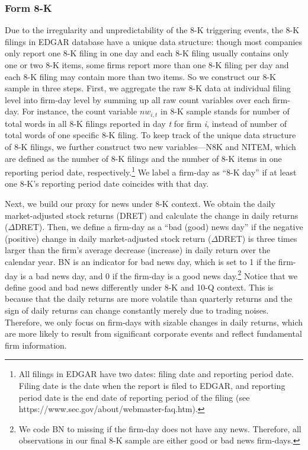 \documentclass[letterpaper,11pt]{article}
\begin{document}
\begin{spacing}{1.5}
\subsubsection{Form 8-K}
Due to the irregularity and unpredictability of the 8-K triggering events, the 8-K filings in EDGAR database have a unique data structure: though most companies only report one 8-K filing in one day and each 8-K filing usually contains only one or two 8-K items, some firms report more than one 8-K filing per day and each 8-K filing may contain more than two items. So we construct our 8-K sample in three steps. First, we aggregate the raw 8-K data at individual filing level into firm-day level by summing up all raw count variables over each firm-day. For instance, the count variable $nw_{i,t}$ in 8-K sample stands for number of total words in all 8-K filings reported in day \textit{t} for firm \textit{i}, instead of number of total words of one specific 8-K filing. To keep track of the unique data structure of 8-K filings, we further construct two new variables---N8K and NITEM, which are defined as the number of 8-K filings and the number of 8-K items in one reporting period date, respectively.\footnote{All filings in EDGAR have two dates: filing date and reporting period date. Filing date is the date when the report is filed to EDGAR, and reporting period date is the end date of reporting period of the filing (see https://www.sec.gov/about/webmaster-faq.htm).} We label a firm-day as ``8-K day” if at least one 8-K's reporting period date coincides with that day.

Next, we build our proxy for news under 8-K context. We obtain the daily market-adjusted stock returns (DRET) and calculate the change in daily returns ($\Delta$DRET). Then, we define a firm-day as a ``bad (good) news day” if the negative (positive) change in daily market-adjusted stock return ($\Delta$DRET) is three times larger than the firm's average decrease (increase) in daily return over the calendar year. BN is an indicator for bad news day, which is set to 1 if the firm-day is a bad news day, and 0 if the firm-day is a good news day.\footnote{We code BN to missing if the firm-day does not have any news. Therefore, all observations in our final 8-K sample are either good or bad news firm-days.} Notice that we define good and bad news differently under 8-K and 10-Q context. This is because that the daily returns are more volatile than quarterly returns and the sign of daily returns can change constantly merely due to trading noises. Therefore, we only focus on firm-days with sizable changes in daily returns, which are more likely to result from significant corporate events and reflect fundamental firm information.


\end{spacing}
\end{document}
